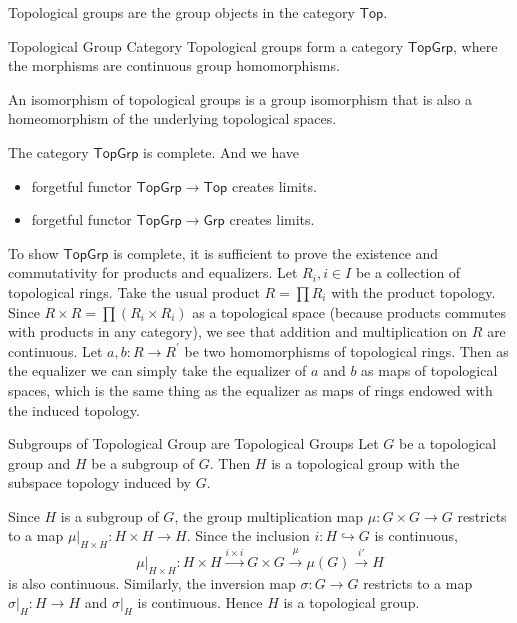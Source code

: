 \documentclass{report}
\begin{document}
\noindent Topological groups are the group objects in the category $\mathsf{Top}$.
\begin{definition}{Topological Group Category}{}
	Topological groups form a category $\mathsf{TopGrp}$, where the morphisms are continuous group homomorphisms.
\end{definition}


\noindent An isomorphism of topological groups is a group isomorphism that is also a homeomorphism of the underlying topological spaces.
\begin{proposition}{}{}
	The category $\mathsf{TopGrp}$ is complete. And we have
	\begin{itemize}
		\item forgetful functor $\mathsf{TopGrp}\to\mathsf{Top}$ creates limits.
		\item forgetful functor $\mathsf{TopGrp}\to\mathsf{Grp}$ creates limits.
	\end{itemize}
\end{proposition}

\begin{prf}
	To show $\mathsf{TopGrp}$ is complete, it is sufficient to prove the existence and commutativity for products and equalizers. Let $R_i, i \in I$ be a collection of topological rings. Take the usual product $R=\prod R_i$ with the product topology. Since $R \times R=\prod\left(R_i \times R_i\right)$ as a topological space (because products commutes with products in any category), we see that addition and multiplication on $R$ are continuous. Let $a, b: R \rightarrow R^{\prime}$ be two homomorphisms of topological rings. Then as the equalizer we can simply take the equalizer of $a$ and $b$ as maps of topological spaces, which is the same thing as the equalizer as maps of rings endowed with the induced topology.
\end{prf}


\begin{proposition}{Subgroups of Topological Group are Topological Groups}{}
	Let $G$ be a topological group and $H$ be a subgroup of $G$. Then $H$ is a topological group with the subspace topology induced by $G$.
\end{proposition}

\begin{prf}
	Since $H$ is a subgroup of $G$, the group multiplication map $\mu:G\times G\to G$ restricts to a map $\mu|_{H\times H}:H\times H\to H$. Since the inclusion $i:H\hookrightarrow G$ is continuous,
	\[
		\mu|_{H\times H}:H \times H \xrightarrow{i\times i} G\times G\xrightarrow{\mu}\mu(G)  \xrightarrow{i'} H
	\]
	is also continuous. Similarly, the inversion map $\sigma:G\to G$ restricts to a map $\sigma|_H:H\to H$ and $\sigma|_H$ is continuous. Hence $H$ is a topological group.

\end{prf}
\end{document}
